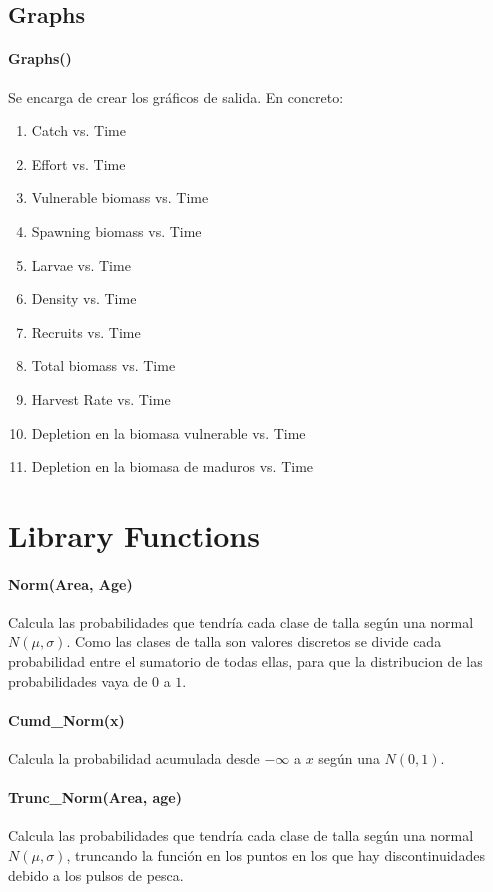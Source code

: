 \documentclass[12pt, oneside, a4paper]{article}
\begin{document}
		\subsection{Graphs}
			\paragraph{Graphs()} Se encarga de crear los gráficos de salida. En concreto:
				\begin{enumerate}
					\item Catch vs. Time
					\item Effort vs. Time
					\item Vulnerable biomass vs. Time
					\item Spawning biomass vs. Time
					\item Larvae vs. Time
					\item Density vs. Time
					\item Recruits vs. Time
					\item Total biomass vs. Time
					\item Harvest Rate vs. Time
					\item Depletion en la biomasa vulnerable vs. Time
					\item Depletion en la biomasa de maduros vs. Time
				\end{enumerate}
		
		
		

	\section{Library Functions}
	
	\paragraph{Norm(Area, Age)} Calcula las probabilidades que tendría cada clase de talla según una normal $N(\mu, \sigma)$. Como las clases de talla son valores discretos se divide cada probabilidad entre el sumatorio de todas ellas, para que la distribucion de las probabilidades vaya de $0$ a $1$.
	\paragraph{Cumd\_Norm(x)} Calcula la probabilidad acumulada desde $-\infty$ a $x$ según una $N(0,1)$.
	\paragraph{Trunc\_Norm(Area, age)} Calcula las probabilidades que tendría cada clase de talla según una normal $N(\mu, \sigma)$, truncando la función en los puntos en los que hay discontinuidades debido a los pulsos de pesca.
\end{document}
